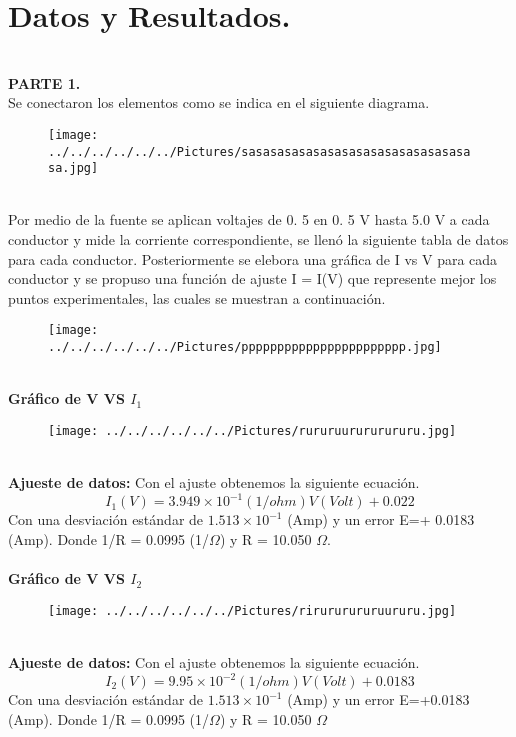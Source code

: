 \documentclass[11pt,a4paper]{article}
\begin{document}
\section{Datos y Resultados.}\\
\textbf{PARTE 1.}\\
Se conectaron los elementos como se indica en el siguiente diagrama. 
\\
\begin{figure}[hbtp]
\centering
\texttt{[image: ../../../../../../Pictures/sasasasasasasasasasasasasasasasasa.jpg]}
\end{figure}
\\
Por medio de la fuente se aplican voltajes de 0. 5 en 0. 5 V hasta 5.0 V a cada conductor y mide  la corriente correspondiente, se llen\'{o} la siguiente tabla de datos para cada conductor. Posteriormente se elebora una gr\'{a}fica de I vs V para cada conductor y se propuso una funci\'{o}n de ajuste I = I(V) que represente mejor los puntos experimentales, las cuales se muestran a continuaci\'{o}n.
\\
\begin{figure}[hbtp]
\centering
\texttt{[image: ../../../../../../Pictures/ppppppppppppppppppppppp.jpg]}
\end{figure}
\\
\textbf{Gr\'{a}fico de V VS ${I}_{1}$}
\\
\begin{figure}[hbtp]
\centering
\texttt{[image: ../../../../../../Pictures/rururuurururururu.jpg]}
\end{figure}
\\
\textbf{Ajueste de datos:} Con el ajuste obtenemos la siguiente ecuaci\'{o}n.
\[{I}_{1}(V)=3.949\times {10}^{-1} (1/ohm)V (Volt) + 0.022  \]
Con una desviaci\'{o}n est\'{a}ndar de $1.513\times {10}^{-1}$ (Amp) y un error E=+ 0.0183 (Amp). Donde 1/R = 0.0995 (1/$\Omega $) y R = 10.050 $\Omega$.
\\
\\
\textbf{Gr\'{a}fico de V VS ${I}_{2}$}
\\
\begin{figure}[hbtp]
\centering
\texttt{[image: ../../../../../../Pictures/rirururururuururu.jpg]} 
\end{figure}
\\
\textbf{Ajueste de datos:} Con el ajuste obtenemos la siguiente ecuaci\'{o}n.
\[{I}_{2}(V)=9.95\times {10}^{-2} (1/ohm)V (Volt) + 0.0183  \]
Con una desviaci\'{o}n est\'{a}ndar de $1.513 \times {10}^{-1}$ (Amp)  y un error E=+0.0183 (Amp). Donde 1/R = 0.0995 (1/$\Omega	$) y R = 10.050 $\Omega$
\end{document}
